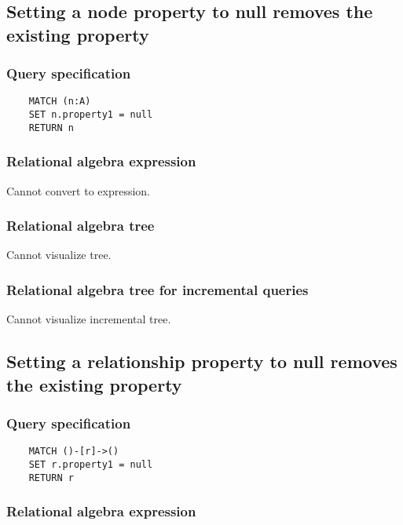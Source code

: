 	\subsection{Setting a node property to null removes the existing property}

	\subsubsection*{Query specification}

	\begin{lstlisting}
	MATCH (n:A)
	SET n.property1 = null
	RETURN n
	\end{lstlisting}


	\subsubsection*{Relational algebra expression}

	Cannot convert to expression.

	\subsubsection*{Relational algebra tree}

	Cannot visualize tree.

	\subsubsection*{Relational algebra tree for incremental queries}

	Cannot visualize incremental tree.
	\subsection{Setting a relationship property to null removes the existing property}

	\subsubsection*{Query specification}

	\begin{lstlisting}
	MATCH ()-[r]->()
	SET r.property1 = null
	RETURN r
	\end{lstlisting}


	\subsubsection*{Relational algebra expression}

